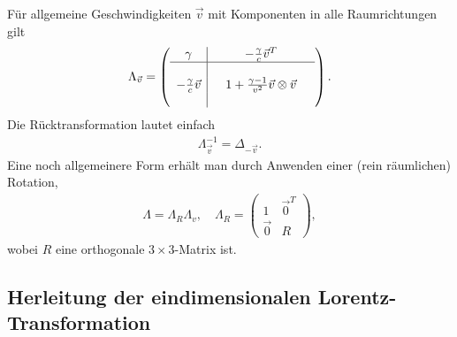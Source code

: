 Für allgemeine Geschwindigkeiten $\vec v$ mit Komponenten in alle Raumrichtungen gilt
\begin{align*}
    \Lambda_{\vec v}=
    \left(\begin{array}{c|ccc}
                  \gamma                   &  & -\frac{\gamma}{c}\vec{v}^T                    & \\
                  \hline
                                           &  &                                               & \\
                  -\frac{\gamma}{c}\vec{v} &  & 1 + \frac{\gamma-1}{v^2}\vec{v}\otimes\vec{v} & \\
                                           &  &                                               &
              \end{array}\right).
\end{align*}
Die Rücktransformation lautet einfach
\begin{align*}
    \Lambda^{-1}_{\vec v}= \Delta_{-\vec v}.
\end{align*}
Eine noch allgemeinere Form erhält man durch Anwenden einer (rein räumlichen) Rotation,
\begin{align*}
    \Lambda = \Lambda_R\Lambda_v, \quad \Lambda_R=\begin{pmatrix}
                                                      1      & \vec 0^T \\
                                                      \vec 0 & R
                                                  \end{pmatrix},
\end{align*}
wobei $R$ eine orthogonale $3\times 3$-Matrix ist.



\subsection{Herleitung der eindimensionalen Lorentz-Transformation}

